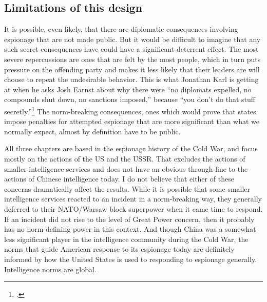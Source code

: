 \documentclass{memoir}
\begin{document}
\begin{refsegment}
\subsection{Limitations of this design}
It is possible, even likely, that there are diplomatic consequences involving espionage that are not made public. But it would be difficult to imagine that any such secret consequences have could have a significant deterrent effect.  The most severe repercussions are ones that are felt by the most people, which in turn puts pressure on the offending party and makes it less likely that their leaders are will choose to repeat the undesirable behavior. This is what Jonathan Karl is getting at when he asks Josh Earnst about why there were ``no diplomats expelled, no compounds shut down, no sanctions imposed,'' because ``you don't do that stuff secretly.''\footcite{earnest_press_2017} The norm-breaking consequences, ones which would prove that states impose penalties for attempted espionage that are more significant than what we normally expect, almost by definition have to be public.

All three chapters are based in the espionage history of the Cold War, and focus mostly on the actions of the US and the USSR. That excludes the actions of smaller intelligence services and does not have an obvious through-line to the actions of Chinese intelligence today. I do not believe that either of these concerns dramatically affect the results. While it is possible that some smaller intelligence services reacted to an incident in a norm-breaking way, they generally deferred to their NATO/Warsaw block superpower when it came time to respond. If an incident did not rise to the level of Great Power concern, then it probably has no norm-defining power in this context. And though China was a somewhat less significant player in the intelligence community during the Cold War, the norms that guide American response to its espionage today are definitely informed by how the United States is used to responding to espionage generally. Intelligence norms are global.



\end{refsegment}
\end{document}

